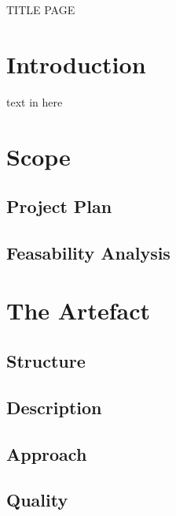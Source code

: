 \documentclass{article}
\begin{document}
TITLE PAGE

\pagebreak

\tableofcontents

\pagebreak

\section{Introduction}
text in here

\section{Scope}

\subsection{Project Plan}

\subsection{Feasability Analysis}

\section{The Artefact}
\subsection{Structure}
\subsection{Description}
\subsection{Approach}
\subsection{Quality}
\end{document}
